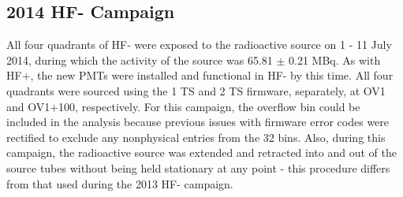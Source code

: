 \subsection{2014 HF- Campaign}
All four quadrants of HF- were exposed to the radioactive source on 1 - 11 July
2014, during which the activity of the source was 65.81 $\pm$ 0.21 \unit{MBq}.
As with HF+, the new PMTs were installed and functional in HF- by this time.
All four quadrants were sourced using the 1 TS and 2 TS firmware, separately, at
OV1 and OV1+100, respectively. For this campaign, the overflow bin could be
included in the analysis because previous issues with firmware error codes were
rectified to exclude any nonphysical entries from the 32 bins. Also, during
this campaign, the radioactive source was extended and retracted into and out
of the source tubes without being held stationary at any point - this
procedure differs from that used during the 2013 HF- campaign.


